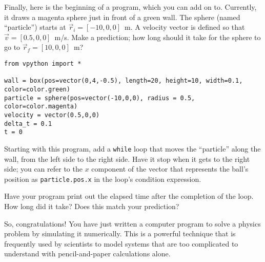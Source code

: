 \documentclass[11pt]{article}
\begin{document}
Finally, here is the beginning of a program, which you can add on to.
Currently, it draws a magenta sphere just in front of a green wall.
The sphere (named ``particle'') starts at $\vec{r}_i = [-10, 0, 0]$~m.  
A velocity vector is defined so that $\vec{v} = [0.5, 0, 0]$~m/s.
Make a prediction; how long should it take for the sphere to go to
$\vec{r}_f = [10, 0, 0]$~m?

{\small{
\begin{verbatim}
from vpython import *

wall = box(pos=vector(0,4,-0.5), length=20, height=10, width=0.1, color=color.green)
particle = sphere(pos=vector(-10,0,0), radius = 0.5, color=color.magenta)
velocity = vector(0.5,0,0)
delta_t = 0.1
t = 0
\end{verbatim}
}}
Starting with this program, add a {\texttt {while}} loop that moves the ``particle''  
along the wall, from the left side to the right side.  Have it stop when it 
gets to the right side; you can refer to the $x$ component of the vector that 
represents the ball's position as {\texttt {particle.pos.x}} in the loop's 
condition expression. 

Have your program print out the elapsed time after the completion of the
loop.  How long did it take?  Does this match your prediction?

So, congratulations!  You have just written a computer program to solve
a physics problem by simulating it numerically.  This is a powerful technique 
that is frequently used by scientists to model systems that are too 
complicated to understand with pencil-and-paper calculations alone.
\end{document}
